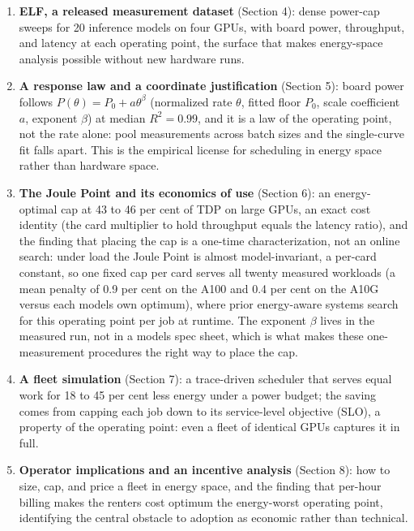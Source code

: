 \documentclass[3p,twocolumn]{elsarticle}
\begin{document}
\begin{enumerate}
\tightlist
\item
  \textbf{ELF, a released measurement dataset} (Section 4): dense power-cap sweeps for 20 inference models on
  four GPUs, with board power, throughput, and latency at each operating point, the surface that makes
  energy-space analysis possible without new hardware runs.
\item
  \textbf{A response law and a coordinate justification} (Section 5): board power follows
  {\(P(\theta)=P_0+a\theta^{\beta}\)} (normalized rate {\(\theta\)}, fitted floor {\(P_0\)}, scale coefficient {\(a\)}, exponent {\(\beta\)}) at median {\(R^2=0.99\)}, and it is a law of
  the operating point, not the rate alone: pool measurements across batch sizes and the single-curve fit falls
  apart. This is the empirical license for
  scheduling in energy space rather than hardware space.
\item
  \textbf{The Joule Point and its economics of use} (Section 6): an energy-optimal cap at 43 to
  46 per cent of TDP on large GPUs, an exact cost identity (the card multiplier to hold throughput
  equals the latency ratio), and the finding that placing the cap is a one-time characterization, not an online
  search: under load the Joule Point is almost model-invariant, a per-card constant, so one fixed cap per card
  serves all twenty measured workloads (a mean penalty of 0.9 per cent on the A100 and
  0.4 per cent on the A10G versus each model\textquotesingle s own optimum), where prior energy-aware systems
  search for this operating point per job at runtime. The exponent {\(\beta\)} lives in the measured run, not in a
  model\textquotesingle s spec sheet, which is what makes these one-measurement procedures the right way to place the
  cap.
\item
  \textbf{A fleet simulation} (Section 7): a trace-driven scheduler that serves equal work for 18 to
  45 per cent less energy under a power budget; the saving comes from capping each job down to its
  service-level objective (SLO), a property of the operating point: even a fleet of identical GPUs captures it in
  full.
\item
  \textbf{Operator implications and an incentive analysis} (Section 8): how to size, cap, and price a fleet in
  energy space, and the finding that per-hour billing makes the renter\textquotesingle s cost optimum the energy-worst operating
  point, identifying the central obstacle to adoption as economic rather than technical.
\end{enumerate}
\end{document}

